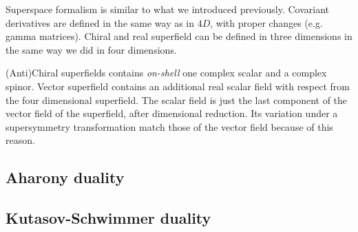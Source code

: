 Superspace formalism is similar to what we introduced previously.
Covariant derivatives are defined in the same way as in $4D$, with proper changes (e.g. gamma matrices).  
Chiral and real superfield can be defined in three dimensions in the same way we did in four dimensions. 

(Anti)Chiral superfields contains \emph{on-shell} one complex scalar and a complex spinor.
Vector superfield contains an additional real scalar field with respect from the four dimensional superfield.
The scalar field is just the last component of the vector field of the superfield, after dimensional reduction. 
Its variation under a supersymmetry transformation match those of the vector field because of this reason.




		\subsection{Aharony duality}
		\subsection{Kutasov-Schwimmer duality}
